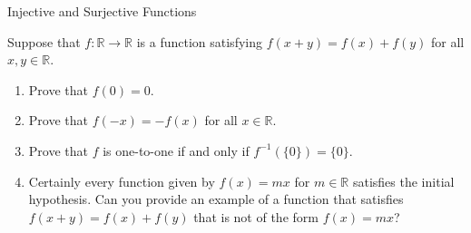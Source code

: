\begin{section}{Injective and Surjective Functions}
\begin{problem}
Suppose that $f: \mathbb{R}\to \mathbb{R}$ is a function satisfying $f(x+y)=f(x)+f(y)$ for all $x,y\in\mathbb{R}$.
\begin{enumerate}
\item Prove that $f(0)=0$.
\item Prove that $f(-x)=-f(x)$ for all $x\in\mathbb{R}$.
\item Prove that $f$ is one-to-one if and only if $f^{-1}(\{0\})=\{0\}$.
\item Certainly every function given by $f(x)=mx$ for $m\in\mathbb{R}$ satisfies the initial hypothesis. Can you provide an example of a function that satisfies $f(x+y)=f(x)+f(y)$ that is not of the form $f(x)=mx$?
\end{enumerate}
\end{problem}

\end{section}